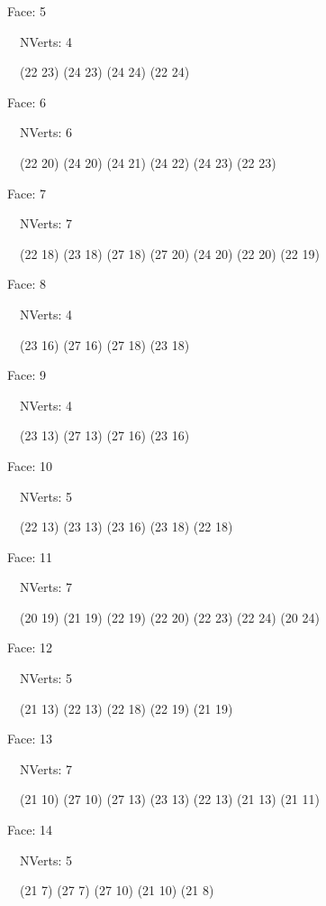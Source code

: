 \documentclass{article}
\begin{document}
{\footnotesize 

Face: 5

\   \    NVerts: 4

 \   \   (22 23) (24 23) (24 24) (22 24)}

{\footnotesize 

Face: 6

\   \    NVerts: 6

 \   \   (22 20) (24 20) (24 21) (24 22) (24 23) (22 23)}

{\footnotesize 

Face: 7

\   \    NVerts: 7

 \   \   (22 18) (23 18) (27 18) (27 20) (24 20) (22 20) (22 19)}

{\footnotesize 

Face: 8

\   \    NVerts: 4

 \   \   (23 16) (27 16) (27 18) (23 18)}

{\footnotesize 

Face: 9

\   \    NVerts: 4

 \   \   (23 13) (27 13) (27 16) (23 16)}

{\footnotesize 

Face: 10

\   \    NVerts: 5

 \   \   (22 13) (23 13) (23 16) (23 18) (22 18)}

{\footnotesize 

Face: 11

\   \    NVerts: 7

 \   \   (20 19) (21 19) (22 19) (22 20) (22 23) (22 24) (20 24)}

{\footnotesize 

Face: 12

\   \    NVerts: 5

 \   \   (21 13) (22 13) (22 18) (22 19) (21 19)}

{\footnotesize 

Face: 13

\   \    NVerts: 7

 \   \   (21 10) (27 10) (27 13) (23 13) (22 13) (21 13) (21 11)}

{\footnotesize 

Face: 14

\   \    NVerts: 5

 \   \   (21 7) (27 7) (27 10) (21 10) (21 8)}
\end{document}
